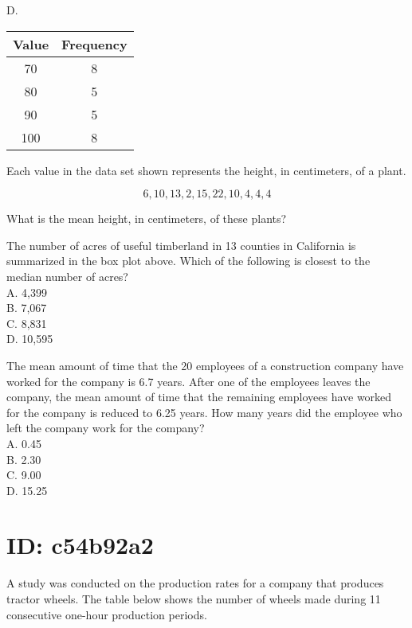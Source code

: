 D.

\begin{center}
\begin{tabular}{|c|c|}
\hline
Value & Frequency \\
\hline
70 & 8 \\
\hline
80 & 5 \\
\hline
90 & 5 \\
\hline
100 & 8 \\
\hline
\end{tabular}
\end{center}

Each value in the data set shown represents the height, in centimeters, of a plant.

$$
6,10,13,2,15,22,10,4,4,4
$$

What is the mean height, in centimeters, of these plants?

The number of acres of useful timberland in 13 counties in California is summarized in the box plot above. Which of the following is closest to the median number of acres?\\
A. 4,399\\
B. 7,067\\
C. 8,831\\
D. 10,595

The mean amount of time that the 20 employees of a construction company have worked for the company is 6.7 years. After one of the employees leaves the company, the mean amount of time that the remaining employees have worked for the company is reduced to 6.25 years. How many years did the employee who left the company work for the company?\\
A. 0.45\\
B. 2.30\\
C. 9.00\\
D. 15.25























\section*{ID: c54b92a2}
A study was conducted on the production rates for a company that produces tractor wheels. The table below shows the number of wheels made during 11 consecutive one-hour production periods.

